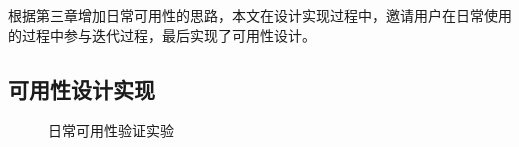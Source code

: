 根据第三章增加日常可用性的思路，本文在设计实现过程中，邀请用户在日常使用的过程中参与迭代过程，最后实现了可用性设计。

\subsection{可用性设计实现}

\begin{figure}[h]
    \centering
    \caption{日常可用性验证实验}
    \label{fig:interface}
\end{figure}

